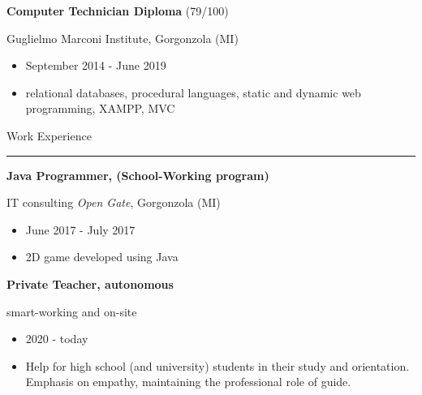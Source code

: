 \documentclass[a4paper]{letter}
\begin{document}
\begin{minipage}[t]{0.65\textwidth}
{\large \textbf{Computer Technician Diploma} \small (79/100)}

{\small Guglielmo Marconi Institute, Gorgonzola (MI)}
\begin{itemize}
    \item September 2014 - June 2019
    \item relational databases, procedural languages, static and dynamic web programming, XAMPP, MVC
\end{itemize}

\vspace{0.5cm}

{\large Work Experience}
\rule{\linewidth}{0.4pt}

{\large \textbf{Java Programmer, (School-Working program)}}

{\small  IT consulting \textit{Open Gate}, Gorgonzola (MI)}

\begin{itemize}
    \item June 2017 - July 2017
    \item 2D game developed using Java
\end{itemize}

{\large \textbf{Private Teacher, autonomous}}

{\small smart-working and on-site}

\begin{itemize}
    \item 2020 - today
    \item Help for high school (and university) students in their study and orientation. Emphasis on empathy, maintaining the professional role of guide.
\end{itemize}

\end{minipage}
\end{document}
